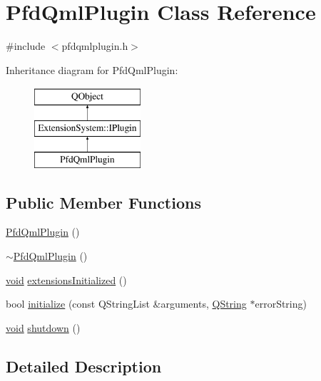 \hypertarget{class_pfd_qml_plugin}{\section{Pfd\-Qml\-Plugin Class Reference}
\label{class_pfd_qml_plugin}
}


{\ttfamily \#include $<$pfdqmlplugin.\-h$>$}

Inheritance diagram for Pfd\-Qml\-Plugin\-:\begin{figure}[H]
\begin{center}
\leavevmode
\includegraphics[height=3.000000cm]{class_pfd_qml_plugin}
\end{center}
\end{figure}
\subsection*{Public Member Functions}
\begin{DoxyCompactItemize}
\item 
\hyperlink{class_pfd_qml_plugin_a9955332218a872bfa18350ec1b73c03c}{Pfd\-Qml\-Plugin} ()
\item 
\hyperlink{class_pfd_qml_plugin_a374958f01b874394eeb1beca385e7598}{$\sim$\-Pfd\-Qml\-Plugin} ()
\item 
\hyperlink{group___u_a_v_objects_plugin_ga444cf2ff3f0ecbe028adce838d373f5c}{void} \hyperlink{class_pfd_qml_plugin_a6c95a7f2f165134d33ef84acdf6a96f8}{extensions\-Initialized} ()
\item 
bool \hyperlink{class_pfd_qml_plugin_a5829e5ecd64024c4d9962550c0beffcb}{initialize} (const Q\-String\-List \&arguments, \hyperlink{group___u_a_v_objects_plugin_gab9d252f49c333c94a72f97ce3105a32d}{Q\-String} $\ast$error\-String)
\item 
\hyperlink{group___u_a_v_objects_plugin_ga444cf2ff3f0ecbe028adce838d373f5c}{void} \hyperlink{class_pfd_qml_plugin_a39d4ab7d539a9a77adc57b8ecf33e781}{shutdown} ()
\end{DoxyCompactItemize}


\subsection{Detailed Description}


